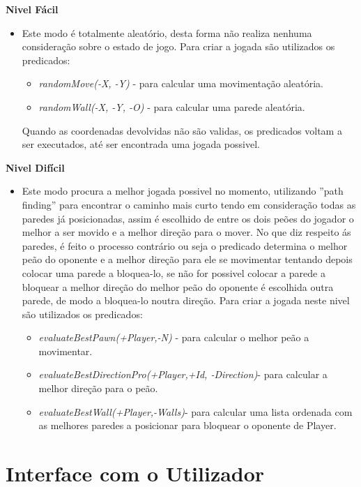 \documentclass[a4paper]{article}
\begin{document}
\textbf{Nivel Fácil}
\begin{itemize}
\item Este modo é totalmente aleatório, desta forma não realiza nenhuma consideração sobre o estado de jogo. Para criar a jogada são utilizados os predicados:
	\begin{itemize}
		\item \textit{randomMove(-X, -Y)} - para calcular uma movimentação aleatória.
		\item \textit{randomWall(-X, -Y, -O)} - para calcular uma parede aleatória.
	\end{itemize}
	 Quando as coordenadas devolvidas não são validas, os predicados voltam a ser executados, até ser encontrada uma jogada possivel.
\end{itemize}

\textbf{Nivel Difícil}
\begin{itemize}
\item Este modo procura a melhor jogada possivel no momento, utilizando ''path finding'' para encontrar o caminho mais curto tendo em consideração todas as paredes já posicionadas, assim é escolhido de entre os dois peões do jogador o melhor a ser movido e a melhor direção para o mover.
No que diz respeito ás paredes, é feito o processo contrário ou seja o predicado determina o melhor peão do oponente e a melhor direção para ele se movimentar tentando depois colocar uma parede a bloquea-lo, se não for possivel colocar a parede a bloquear a melhor direção do melhor peão do oponente é escolhida outra parede, de modo a bloquea-lo noutra direção.
 Para criar a jogada neste nivel são utilizados os predicados:
 \begin{itemize}
		\item \textit{evaluateBestPawn(+Player,-N)} - para calcular o melhor peão a movimentar.
		\item \textit{evaluateBestDirectionPro(+Player,+Id, -Direction)}-  para calcular a melhor direção para o peão.
		\item \textit{evaluateBestWall(+Player,-Walls)}- para calcular uma lista ordenada com as melhores paredes a posicionar para bloquear o oponente de Player.
	\end{itemize}
\end{itemize}







\newpage
\section{Interface com o Utilizador}
\end{document}
